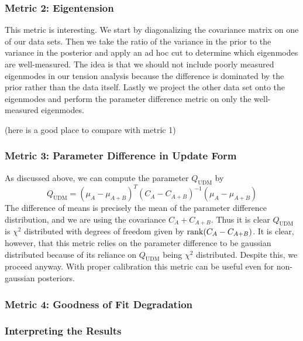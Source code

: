 \subsubsection{Metric 2: Eigentension}
This metric is interesting.
We start by diagonalizing the covariance matrix on one of our data sets.
Then we take the ratio of the variance in the prior to the variance in the posterior and apply an ad hoc cut to determine which eigenmodes are well-measured.
The idea is that we should not include poorly measured eigenmodes in our tension analysis because the difference is dominated by the prior rather than the data itself.
Lastly we project the other data set onto the eigenmodes and perform the parameter difference metric on only the well-measured eigenmodes.

(here is a good place to compare with metric 1)

\subsubsection{Metric 3: Parameter Difference in Update Form}
As discussed above, we can compute the parameter $Q_{\mathrm{UDM}}$ by
\begin{equation}
    Q_{\mathrm{UDM}} = {(\mu_A - \mu_{A+B})}^T{(C_A-C_{A+B})}^{-1}(\mu_A - \mu_{A+B}) 
\end{equation}
The difference of means is precisely the mean of the parameter difference distribution, and we are using the covariance $C_A+C_{A+B}$.
Thus it is clear $Q_{\mathrm{UDM}}$ is $\chi^2$ distributed with degrees of freedom given by $\rank(C_A-C_{A+B})$. 
It is clear, however, that this metric relies on the parameter difference to be gaussian distributed because of its reliance on $Q_{\mathrm{UDM}}$ being $\chi^2$ distributed. Despite this, we proceed anyway. With proper calibration this metric can be useful even for non-gaussian posteriors.

\subsubsection{Metric 4: Goodness of Fit Degradation}

\subsubsection{Interpreting the Results}

